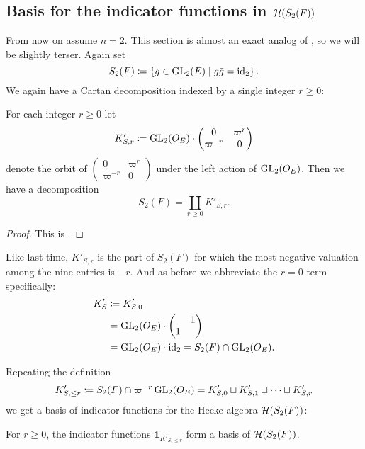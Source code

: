 \subsection{Basis for the indicator functions in $\HH(S_2(F))$}
\label{sec:hecke_basis_FJ}
From now on assume $n = 2$.
This section is almost an exact analog of ,
so we will be slightly terser.
Again set
\[ S_2(F) \coloneqq \left\{ g \in \operatorname{GL}_2(E) \mid g \bar{g} = \operatorname{id}_2 \right\}. \]
We again have a Cartan decomposition indexed by a single integer $r \ge 0$:
\begin{lemma}
  For each integer $r \ge 0$ let
  \[ K'_{S,r} \coloneqq \operatorname{GL}_2(O_E) \cdot
    \begin{pmatrix} 0 & \varpi^r \\ \varpi^{-r} & 0 \end{pmatrix} \]
  denote the orbit of
  $\begin{pmatrix} 0 & \varpi^r \\ \varpi^{-r} & 0 \end{pmatrix}$
  under the left action of $\operatorname{GL}_2(O_E)$.
  Then we have a decomposition
  \[ S_2(F) = \coprod_{r \geq 0} K'_{S,r}. \]
\end{lemma}
\begin{proof}
  This is \cite[Equation (7.1.7) and (7.1.8)]{ref:AFLspherical}.
\end{proof}

Like last time, $K'_{S,r}$ is the part of $S_2(F)$
for which the most negative valuation among the nine entries is $-r$.
And as before we abbreviate the $r = 0$ term specifically:
\begin{align*}
  K'_S
  &\coloneqq K'_{S,0} \\
  &= \operatorname{GL}_2(O_E) \cdot \begin{pmatrix} & 1 \\ 1 \end{pmatrix} \\
  &= \operatorname{GL}_2(O_E) \cdot \operatorname{id}_2 = S_2(F) \cap \operatorname{GL}_2(O_E).
\end{align*}

Repeating the definition
\[ K'_{S, \le r} \coloneqq S_2(F) \cap \varpi^{-r} \operatorname{GL}_2(O_E)
  = K'_{S,0} \sqcup K'_{S,1} \sqcup \dots \sqcup K'_{S,r} \]
we get a basis of indicator functions for the Hecke algebra $\HH(S_2(F))$:
\begin{corollary}
  [Basis of $\HH(S_2(F))$]
  For $r \ge 0$, the indicator functions $\mathbf{1}_{K'_{S, \le r}}$
  form a basis of $\HH(S_2(F))$.
\end{corollary}

